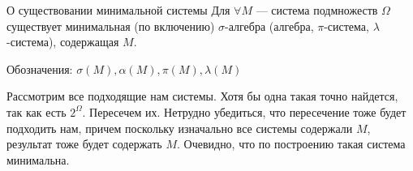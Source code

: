 \begin{lemma}{О существовании минимальной системы}{}
    Для \( \forall M \) --- система подмножеств \( \Omega \)
    существует минимальная (по включению) \( \sigma \)-алгебра
    (алгебра, \( \pi \)-система, \( \lambda \)-система),
    содержащая \( M \).

    Обозначения: \( \sigma(M), \alpha(M), \pi(M), \lambda(M) \)
\end{lemma}

Рассмотрим все подходящие нам системы.
Хотя бы одна такая точно найдется, так как есть \( 2^{\Omega} \).
Пересечем их.
Нетрудно убедиться, что пересечение тоже будет подходить нам,
причем поскольку изначально все системы содержали \( M \),
результат тоже будет содержать \( M \).
Очевидно, что по построению такая система минимальна.


